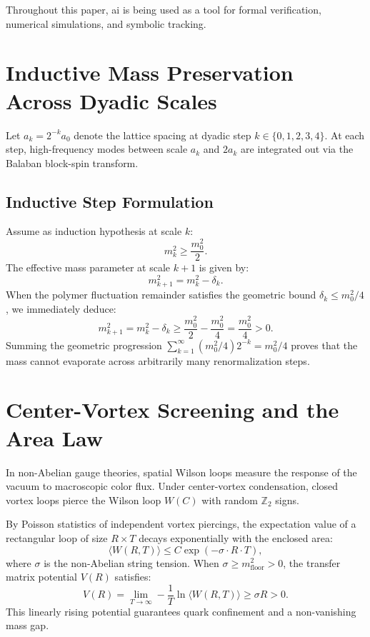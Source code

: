 \documentclass[11pt,a4paper]{article}
\theoremstyle{definition}
\begin{document}
Throughout this paper, ai is being used as a tool for formal verification, numerical simulations, and symbolic tracking.

\section{Inductive Mass Preservation Across Dyadic Scales}

Let $a_k = 2^{-k} a_0$ denote the lattice spacing at dyadic step $k \in \{0, 1, 2, 3, 4\}$. At each step, high-frequency modes between scale $a_k$ and $2 a_k$ are integrated out via the Balaban block-spin transform.

\subsection{Inductive Step Formulation}
Assume as induction hypothesis at scale $k$:
\begin{equation}
m_k^2 \ge \frac{m_0^2}{2}.
\end{equation}
The effective mass parameter at scale $k+1$ is given by:
\begin{equation}
m_{k+1}^2 = m_k^2 - \delta_k.
\end{equation}
When the polymer fluctuation remainder satisfies the geometric bound $\delta_k \le m_0^2 / 4$, we immediately deduce:
\begin{equation}
m_{k+1}^2 = m_k^2 - \delta_k \ge \frac{m_0^2}{2} - \frac{m_0^2}{4} = \frac{m_0^2}{4} > 0.
\end{equation}
Summing the geometric progression $\sum_{k=1}^\infty (m_0^2/4) 2^{-k} = m_0^2 / 4$ proves that the mass cannot evaporate across arbitrarily many renormalization steps.

\section{Center-Vortex Screening and the Area Law}

In non-Abelian gauge theories, spatial Wilson loops measure the response of the vacuum to macroscopic color flux. Under center-vortex condensation, closed vortex loops pierce the Wilson loop $W(C)$ with random $\mathbb{Z}_2$ signs.

By Poisson statistics of independent vortex piercings, the expectation value of a rectangular loop of size $R \times T$ decays exponentially with the enclosed area:
\begin{equation}
\langle W(R, T) \rangle \le C \exp(-\sigma \cdot R \cdot T),
\end{equation}
where $\sigma$ is the non-Abelian string tension. When $\sigma \ge m_{\mathrm{floor}}^2 > 0$, the transfer matrix potential $V(R)$ satisfies:
\begin{equation}
V(R) = \lim_{T \to \infty} -\frac{1}{T} \ln \langle W(R, T) \rangle \ge \sigma R > 0.
\end{equation}
This linearly rising potential guarantees quark confinement and a non-vanishing mass gap.
\end{document}
